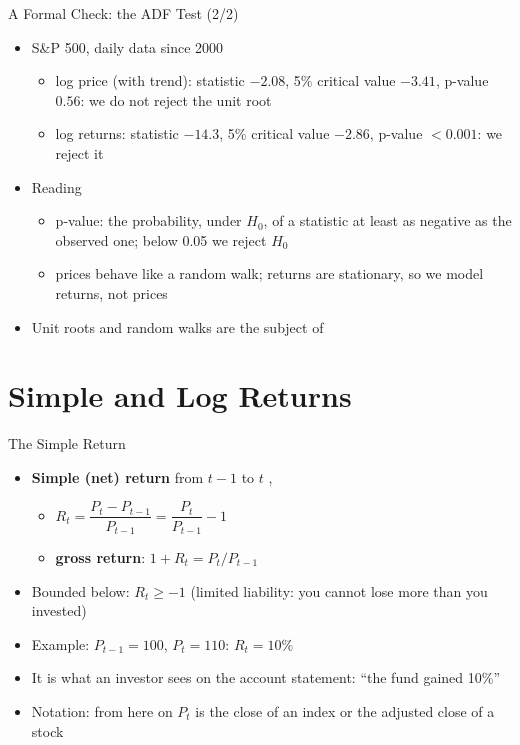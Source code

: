 \begin{frame}{A Formal Check: the ADF Test (2/2)}
\itemsize{\small}
\begin{itemize}
    \item S\&P 500, daily data since 2000
    \begin{itemize}
        \item log price (with trend): statistic $-2.08$, 5\% critical value $-3.41$, p-value $0.56$: we do not reject the unit root
        \item log returns: statistic $-14.3$, 5\% critical value $-2.86$, p-value $< 0.001$: we reject it
    \end{itemize}
    \item Reading
    \begin{itemize}
        \item p-value: the probability, under $H_0$, of a statistic at least as negative as the observed one; below 0.05 we reject $H_0$
        \item prices behave like a random walk; returns are stationary, so we model returns, not prices
    \end{itemize}
    \item Unit roots and random walks are the subject of 
\end{itemize}
\end{frame}


\section{Simple and Log Returns}

\begin{frame}{The Simple Return}
\itemsize{\small}
\begin{itemize}
    \item \textbf{Simple (net) return} from $t-1$ to $t$ , 
    \begin{itemize}
        \item $R_t = \dfrac{P_t - P_{t-1}}{P_{t-1}} = \dfrac{P_t}{P_{t-1}} - 1$
        \item \textbf{gross return}: $1 + R_t = P_t / P_{t-1}$
    \end{itemize}
    \item Bounded below: $R_t \ge -1$ (limited liability: you cannot lose more than you invested)
    \item Example: $P_{t-1} = 100$, $P_t = 110$: $R_t = 10\%$
    \item It is what an investor sees on the account statement: ``the fund gained 10\%''
    \item Notation: from here on $P_t$ is the close of an index or the adjusted close of a stock
\end{itemize}
\end{frame}

